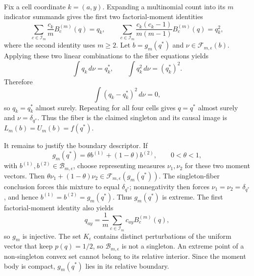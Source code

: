 Fix a cell coordinate \(k=(a,y)\).  Expanding a multinomial count into its \(m\) indicator summands gives the first two factorial-moment identities
\[
 \sum_{c\in\mathcal I_m}\frac{c_k}{m}B_c^{(m)}(q)=q_k,
 \qquad
 \sum_{c\in\mathcal I_m}\frac{c_k(c_k-1)}{m(m-1)}B_c^{(m)}(q)=q_k^2,
\]
where the second identity uses \(m\geq2\).  Let \(b=g_m(q^*)\) and \(\nu\in\mathcal F_{m,\epsilon}(b)\).  Applying these two linear combinations to the fiber equations yields
\[
 \int q_k\,d\nu=q_k^*,
 \qquad
 \int q_k^2\,d\nu=(q_k^*)^2.
\]
Therefore
\[
 \int(q_k-q_k^*)^2\,d\nu=0,
\]
so \(q_k=q_k^*\) almost surely.  Repeating for all four cells gives \(q=q^*\) almost surely and \(\nu=\delta_{q^*}\).  Thus the fiber is the claimed singleton and its causal image is \(L_m(b)=U_m(b)=f(q^*)\).

It remains to justify the boundary descriptor.  If
\[
 g_m(q^*)=\theta b^{(1)}+(1-\theta)b^{(2)},\qquad 0<\theta<1,
\]
with \(b^{(1)},b^{(2)}\in\mathcal B_{m,\epsilon}\), choose representing measures
\(\nu_1,\nu_2\) for these two moment vectors.  Then
\(\theta\nu_1+(1-\theta)\nu_2\in\mathcal F_{m,\epsilon}(g_m(q^*))\).
The singleton-fiber conclusion forces this mixture to equal \(\delta_{q^*}\);
nonnegativity then forces \(\nu_1=\nu_2=\delta_{q^*}\), and hence
\(b^{(1)}=b^{(2)}=g_m(q^*)\).  Thus \(g_m(q^*)\) is extreme.  The first
factorial-moment identity also yields
\[
 q_{ay}=\frac1m\sum_{c\in\mathcal I_m}c_{ay}B_c^{(m)}(q),
\]
so \(g_m\) is injective.  The set \(K_{\epsilon}\) contains distinct
perturbations of the uniform vector that keep \(p(q)=1/2\), so
\(\mathcal B_{m,\epsilon}\) is not a singleton.  An extreme point of a
non-singleton convex set cannot belong to its relative interior.  Since the
moment body is compact, \(g_m(q^*)\) lies in its relative boundary.